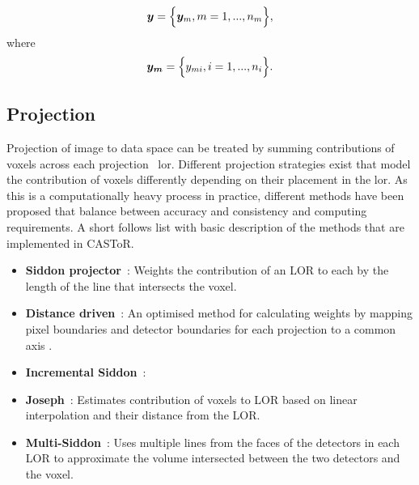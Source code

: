 \begin{equation}
   \bm{y} = \Big\{ {\bm{y}_m,m=1,...,n_m} \Big\} \\,
\end{equation}
where
\begin{equation}
   \bm{y_m} = \Big\{ {y_{mi},i=1,...,n_i} \Big\} \\.
\end{equation}


\subsection{Projection}
Projection of image to data space can be treated by summing contributions of voxels across each projection ~\gls{lor}. Different projection strategies exist that model the contribution of voxels differently depending on their placement in the \gls{lor}. As this is a computationally heavy process in practice, different methods have been proposed that balance between accuracy and consistency and computing requirements. A short follows list with basic description of the methods that are implemented in CASToR.

\begin{itemize}
\item  \textbf{Siddon projector}~\cite{Siddon1985}: Weights the contribution of an LOR to each by the length of the line that intersects the voxel.
\item  \textbf{Distance driven}~\cite{DeMan2004}: An optimised method for calculating weights by mapping pixel boundaries and detector boundaries for each projection to a common axis .
\item  \textbf{Incremental Siddon}~\cite{Jacobs2015}:
\item  \textbf{Joseph}~\cite{Joseph1982}: Estimates contribution of voxels to LOR based on linear interpolation and their distance from the LOR. 
\item  \textbf{Multi-Siddon}~\cite{Moehrs2008}: Uses multiple lines from the faces of the detectors in each LOR to approximate the volume intersected between the two detectors and the voxel.
\end{itemize}

